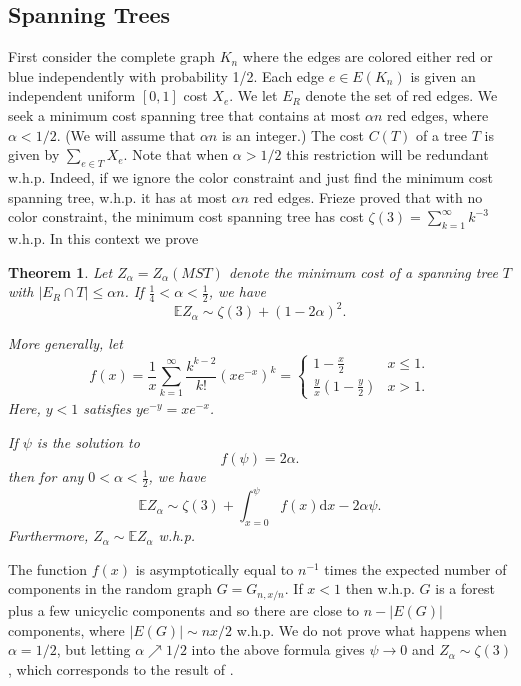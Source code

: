 \documentclass[12pt]{article}
\newcommand{\1}{\textbf{1}}
\def\a{\alpha} \def\b{\beta} \def\d{\delta} \def\D{\Delta}
\def\z{\zeta} \def\th{\theta} \def\TH{\Theta} \def\Th{\Theta}  \def\l{\lambda}
\newtheorem{theorem}{Theorem}
\newcommand{\brac}[1]{\left(#1\right)}
\def\dd{\text{d}}
\def\E{\mathbb{E}}
\newcommand{\beq}[2]{\begin{equation}\label{#1}#2\end{equation}}
\begin{document}
\subsection{Spanning Trees}
First consider the complete graph $K_n$ where the edges are colored  either red or blue independently with probability 1/2. Each edge $e\in E(K_n)$ is given an independent uniform $[0,1]$ cost $X_e$. We let $E_R$ denote the set of red edges. We seek a minimum cost spanning tree that contains at most $\a n$ red edges, where $\a<1/2$. (We will assume that $\a n$ is an integer.) The cost $C(T)$ of a tree $T$ is given by $\sum_{e\in T}X_e$. Note that when $\a>1/2$ this restriction will be redundant w.h.p. Indeed, if we ignore the color constraint and just find the minimum cost spanning tree, w.h.p. it has at most $\a n$ red edges. Frieze \cite{Frieze85} proved that with no color constraint, the minimum cost spanning tree has cost $\z(3) = \sum_{k=1}^\infty k^{-3}$ w.h.p. In this context we prove 
\begin{theorem}\label{th1}
  Let $Z_{\a}=Z_\a(MST)$ denote the minimum cost of a spanning tree $T$ with $|E_R\cap T|\leq \a n$. If $\frac 1 4<\alpha< \frac 1 2$, we have
\[
\E Z_{\a}\sim \z(3)+(1-2\a)^2.
\]

More generally, let
\beq{eqn:fdef}
{
f(x)=\frac{1}{x}\sum_{k=1}^\infty\frac{k^{k-2}}{k!}(xe^{-x})^k=\begin{cases}1-\frac{x}{2}&x\le 1.\\ \frac{y}{x}\brac{1-\frac{y}{2}}&x>1.\end{cases}
}
Here, $y<1$ satisfies $ye^{-y}=xe^{-x}$.

If $\psi$ is the solution to 
\[
f(\psi)=2\a. 
\]
then for any $0<\alpha<\frac 1 2$, we have
\beq{parisi}{
\E Z_{\a}\sim \z(3)+\int_{x=0}^\psi f(x)\dd x-2\a\psi.
}
Furthermore, $Z_\a\sim\E Z_\a$ w.h.p.
\end{theorem}
The function $f(x)$ is asymptotically equal to $n^{-1}$ times the expected number of components in the random graph $G=G_{n,x/n}$. If $x<1$ then w.h.p. $G$ is a forest plus a few unicyclic components and so there are close to $n-|E(G)|$ components, where $|E(G)|\sim nx/2$ w.h.p. We do not prove what happens when $\a=1/2$, but letting $\a \nearrow 1/2$ into the above formula gives $\psi \rightarrow 0$ and $Z_\a\sim \z(3)$, which corresponds to the result of \cite{Frieze85}. 
\end{document}

